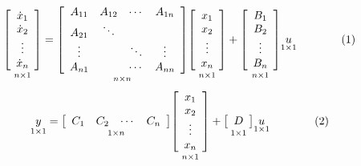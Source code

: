 \documentclass{book}
\begin{document}
\[ \underset{n\times1}{\left[\begin{array}{c} \dot{x}_1\\\dot{x}_2\\\vdots\\\dot{x}_n \end{array}\right]} = \underset{n\times n}{\left[\begin{array}{c c c c} A_{11} & A_{12} & \cdots & A_{1n} \\ A_{21} & \ddots &  &  \\ \vdots &  &  \ddots  &\vdots \\ A_{n1} &  & \cdots & A_{nn} \end{array}\right]} \underset{n\times1}{\left[\begin{array}{c} {x}_1\\{x}_2\\\vdots\\x_n \end{array}\right]} + \underset{n\times1}{\left[\begin{array}{c} B_1 \\B_2 \\\vdots\\B_n \end{array}\right]}\underset{1\times1}{u} \qquad\qquad(1) \]
\[ \underset{1\times1}{y} = \underset{1\times n}{\left[\begin{array}{c c c c} C_{1} & C_{2} & \cdots & C_{n} \end{array}\right]} \underset{n\times1}{\left[\begin{array}{c} {x}_1\\{x}_2\\\vdots\\x_n \end{array}\right]} + \underset{1\times1}{\left[\begin{array}{c} D \end{array}\right]}\underset{1\times1}{u} \qquad\qquad(2) \]
\end{document}
